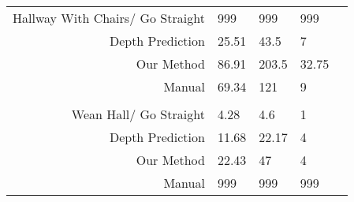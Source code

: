 \documentclass{article}
\begin{document}
\begin{table}[]
\begin{tabular}{rllll}
Hallway With Chairs/ Go Straight & 999      & 999      & 999               &  \\
Depth Prediction                 & 25.51    & 43.5     & 7                 &  \\
Our Method                       & 86.91    & 203.5    & 32.75             &  \\
Manual                           & 69.34    & 121      & 9                 &  \\
\multicolumn{1}{l}{}             &          &          &                   &  \\
Wean Hall/ Go Straight           & 4.28     & 4.6      & 1                 &  \\
Depth Prediction                 & 11.68    & 22.17    & 4                 &  \\
Our Method                       & 22.43    & 47       & 4                 &  \\
Manual                           & 999      & 999      & 999               & 
\end{tabular}
\end{table}
\end{document}
